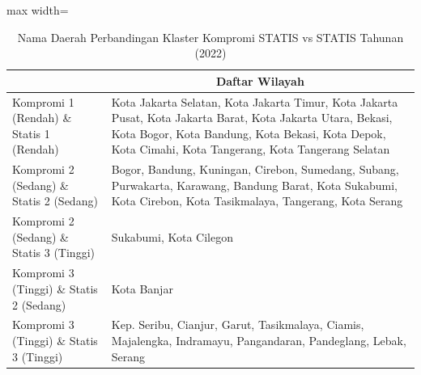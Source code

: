 \begin{table}[H]
\centering
\caption{Nama Daerah Perbandingan Klaster Kompromi STATIS vs STATIS Tahunan (2022)} \label{tab:app2comp_statis_name_2022}
\begin{adjustbox}{max width=\textwidth}
\begin{tabular}{|>{\centering\arraybackslash}p{4cm}|p{10cm}|}
\hline
\multicolumn{1}{|c|}{\textbf{Kategori}} & \multicolumn{1}{c|}{\textbf{Daftar Wilayah}} \\
\hline
Kompromi 1 (Rendah) \& Statis 1 (Rendah) & Kota Jakarta Selatan, Kota Jakarta Timur, Kota Jakarta Pusat, Kota Jakarta Barat, Kota Jakarta Utara, Bekasi, Kota Bogor, Kota Bandung, Kota Bekasi, Kota Depok, Kota Cimahi, Kota Tangerang, Kota Tangerang Selatan \\
\hline
Kompromi 2 (Sedang) \& Statis 2 (Sedang) & Bogor, Bandung, Kuningan, Cirebon, Sumedang, Subang, Purwakarta, Karawang, Bandung Barat, Kota Sukabumi, Kota Cirebon, Kota Tasikmalaya, Tangerang, Kota Serang \\
\hline
Kompromi 2 (Sedang) \& Statis 3 (Tinggi) & Sukabumi, Kota Cilegon \\
\hline
Kompromi 3 (Tinggi) \& Statis 2 (Sedang) & Kota Banjar \\
\hline
Kompromi 3 (Tinggi) \& Statis 3 (Tinggi) & Kep. Seribu, Cianjur, Garut, Tasikmalaya, Ciamis, Majalengka, Indramayu, Pangandaran, Pandeglang, Lebak, Serang \\
\hline
\end{tabular}
\end{adjustbox}
\end{table}